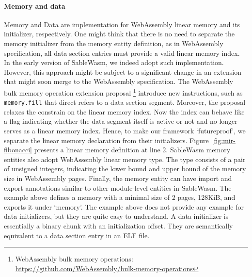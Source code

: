 \paragraph{Memory and data}
Memory and Data are implementation for WebAssembly linear memory and its initializer, respectively. One might think that there is no need to separate the memory initializer from the memory entity definition, as in WebAssembly specification, all data section entries must provide a valid linear memory index. In the early version of SableWasm, we indeed adopt such implementation. However, this approach might be subject to a significant change in an extension that might soon merge to the WebAssembly specification. The WebAssembly bulk memory operation extension proposal \footnote{WebAssembly bulk memory operations: \\\url{https://github.com/WebAssembly/bulk-memory-operations}} introduce new instructions, such as \texttt{memory.fill} that direct refers to a data section segment. Moreover, the proposal relaxes the constrain on the linear memory index. Now the index can behave like a flag indicating whether the data segment itself is active or not and no longer serves as a linear memory index. Hence, to make our framework `futureproof', we separate the linear memory declaration from their initializers. Figure~\ref{fig:mir-fibonacci} presents a linear memory definition at line 2. SableWasm memory entities also adopt WebAssembly linear memory type. The type consists of a pair of unsigned integers, indicating the lower bound and upper bound of the memory size in WebAssembly pages. Finally, the memory entity can have import and export annotations similar to other module-level entities in SableWasm. The example above defines a memory with a minimal size of 2 pages, 128KiB, and exports it under `memory'. The example above does not provide any example for data initializers, but they are quite easy to understand. A data initializer is essentially a binary chunk with an initialization offset. They are semantically equivalent to a data section entry in an ELF file.

